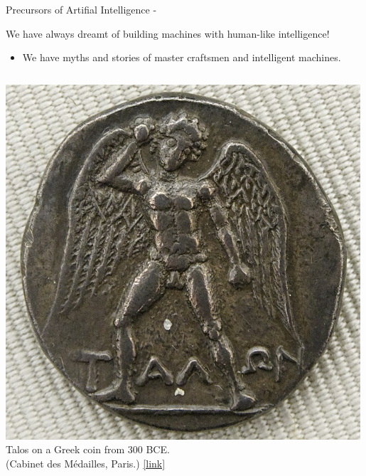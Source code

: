 %
%
%

\begin{frame}[t, allowframebreaks]{Precursors of Artifial Intelligence -}

    \vspace{-0.1cm}
    We have always dreamt of building machines with human-like intelligence!\\
    \begin{itemize}
        \small
        \item
        We have myths and stories of master craftsmen and intelligent machines.\\
    \end{itemize}
    \vspace{-0.4cm}

    \begin{columns}[t]
        \begin{column}{0.46\textwidth}
         \begin{center}
          \includegraphics[width=0.99\textwidth]{./images/precursors/talos.jpg}\\
          {\scriptsize 
          \vspace{0.1cm}
          Talos on a Greek coin from 300 BCE.\\
          \color{col:attribution} 
          (Cabinet des Médailles, Paris.)
          \href{https://en.wikipedia.org/wiki/Talos\#/media/File:Didrachm_Phaistos_obverse_CdM.jpg}{\tiny [link]}
}
\end{center}
\end{column}
\end{columns}
\end{frame}
